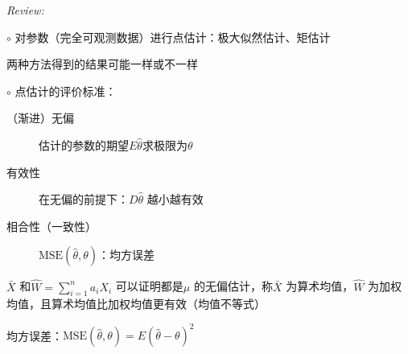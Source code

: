 \textit{Review:}

$\circ$ 对参数（完全可观测数据）进行点估计：极大似然估计、矩估计

两种方法得到的结果可能一样或不一样

$\circ$ 点估计的评价标准：
\begin{description}
    \item [（渐进）无偏] 估计的参数的期望$E \hat{\theta}$求极限为$\theta$
    \item [有效性] 在无偏的前提下：$D \hat{\theta}$ 越小越有效
    \item [相合性（一致性）] $\text{MSE}\left( \hat{\theta},\theta \right)$：均方误差
\end{description}
\begin{eg}
$\bar{X}$ 和$\hat{W}=\sum_{i=1}^{n} a_{i}X_{i}$ 可以证明都是$\mu$ 的无偏估计，称$\bar{X}$ 为算术均值，$\hat{W}$ 为加权均值，且算术均值比加权均值更有效（均值不等式）
\end{eg}
\begin{notation}
均方误差：$\text{MSE}\left( \hat{\theta},\theta \right)=E\left( \hat{\theta}-\theta \right)^2 $
\end{notation}
